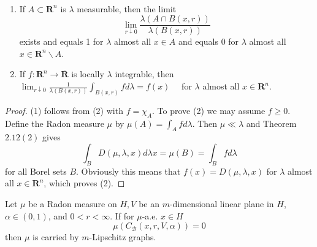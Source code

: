 \begin{corollary}\label{coro:mattila-coro-2.14} $ $
    \begin{enumerate}
        \item If $A \subset \mathbf{R}^{n}$ is $\lambda$ measurable, then the limit
        $$
        \lim _{r \downarrow 0} \frac{\lambda(A \cap B(x, r))}{\lambda(B(x, r))}
        $$
        exists and equals 1 for $\lambda$ almost all $x \in A$ and equals 0 for $\lambda$ almost all $x \in \mathbf{R}^{n} \backslash A$.
        \item If $f: \mathbf{R}^{n} \rightarrow \overline{\mathbf{R}}$ is locally $\lambda$ integrable, then
        $\lim _{r \downarrow 0} \frac{1}{\lambda(B(x, r))} \int_{B(x, r)} f d \lambda=f(x) \quad$ for $\lambda$ almost all $x \in \mathbf{R}^{n}$.
    \end{enumerate}
\end{corollary}
\begin{proof}
    (1) follows from (2) with $f=\chi_{A}$. To prove (2) we may assume $f \geq 0 .$ Define the Radon measure $\mu$ by $\mu(A)=\int_{A} f d \lambda .$ Then $\mu \ll \lambda$ and Theorem $2.12(2)$ gives
$$
\int_{B} D(\mu, \lambda, x) d \lambda x=\mu(B)=\int_{B} f d \lambda
$$
for all Borel sets $B$. Obviously this means that $f(x)=D(\mu, \lambda, x)$ for $\lambda$ almost all $x \in \mathbf{R}^{n}$, which proves (2).
\end{proof}



\newpage
\begin{corollary}
    Let $\mu$ be a Radon measure on $H, V$ be an $m$-dimensional linear plane in $H$, $\alpha \in(0,1)$, and $0<r<\infty$. If for $\mu$-a.e. $x \in H$
    $$
    \mu\left(C_{\mathcal{B}}(x, r, V, \alpha)\right)=0
    $$
    then $\mu$ is carried by $m$-Lipschitz graphs.
\end{corollary}




